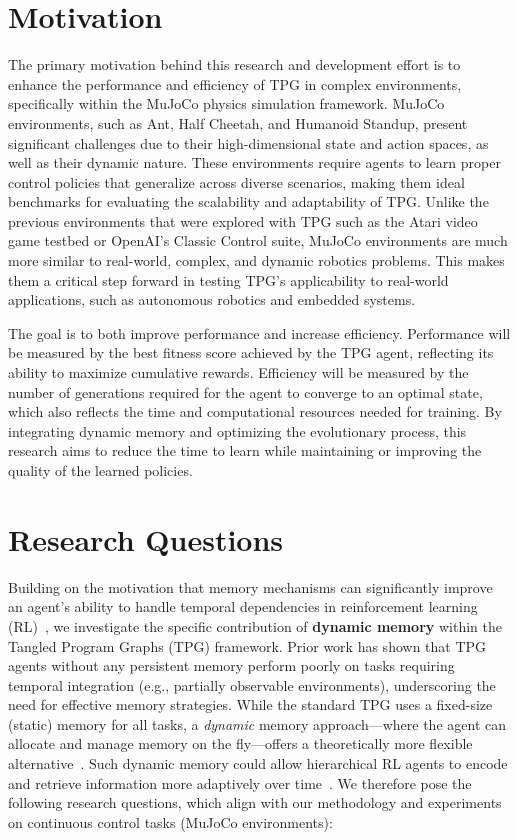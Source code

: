 \documentclass[sigconf]{acmart}
\begin{document}
\section{Motivation}
The primary motivation behind this research and development effort is to enhance the performance and efficiency of TPG in complex environments, specifically within the MuJoCo physics simulation framework. MuJoCo environments, such as Ant, Half Cheetah, and Humanoid Standup, present significant challenges due to their high-dimensional state and action spaces, as well as their dynamic nature. These environments require agents to learn proper control policies that generalize across diverse scenarios, making them ideal benchmarks for evaluating the scalability and adaptability of TPG. Unlike the previous environments that were explored with TPG such as the Atari video game testbed or OpenAI’s Classic Control suite, MuJoCo environments are much more similar to real-world, complex, and dynamic robotics problems. This makes them a critical step forward in testing TPG’s applicability to real-world applications, such as autonomous robotics and embedded systems.

The goal is to both improve performance and increase efficiency. Performance will be measured by the best fitness score achieved by the TPG agent, reflecting its ability to maximize cumulative rewards. Efficiency will be measured by the number of generations required for the agent to converge to an optimal state, which also reflects the time and computational resources needed for training. By integrating dynamic memory and optimizing the evolutionary process, this research aims to reduce the time to learn while maintaining or improving the quality of the learned policies.

\section{Research Questions}

Building on the motivation that memory mechanisms can significantly improve an agent's ability to handle temporal dependencies in reinforcement learning (RL)~\cite{Djavaherpour24}, we investigate the specific contribution of \textbf{dynamic memory} within the Tangled Program Graphs (TPG) framework. Prior work has shown that TPG agents without any persistent memory perform poorly on tasks requiring temporal integration (e.g., partially observable environments)\cite{Kelly21}, underscoring the need for effective memory strategies. While the standard TPG uses a fixed-size (static) memory for all tasks, a \textit{dynamic} memory approach---where the agent can allocate and manage memory on the fly---offers a theoretically more flexible alternative~\cite{Kelly21TELO}. Such dynamic memory could allow hierarchical RL agents to encode and retrieve information more adaptively over time~\cite{Kelly21TELO}. We therefore pose the following research questions, which align with our methodology and experiments on continuous control tasks (MuJoCo environments):
\end{document}
